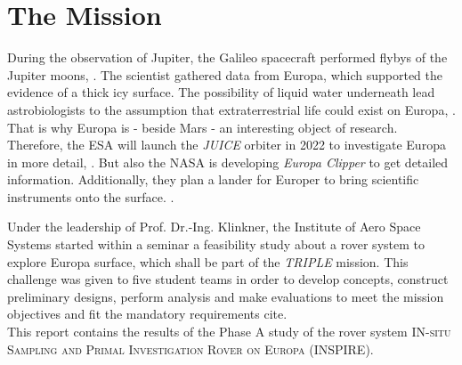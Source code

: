 %
%
%
\chapter{The Mission}
\label{chap:mission}

During the observation  of Jupiter, the Galileo spacecraft performed flybys of the Jupiter moons, \cite{Mission_01}.
The scientist gathered data from Europa, which supported the evidence of a thick icy surface.
The possibility of liquid water underneath lead astrobiologists to the assumption that extraterrestrial life could exist on Europa, \cite{Mission_02}.
That is why Europa is - beside Mars - an interesting object of research.\\

Therefore, the ESA will launch the \textit{JUICE} orbiter in 2022 to investigate Europa in more detail, \cite{Mission_03}. 
But also the NASA is developing  \textit{Europa Clipper} to get detailed information.
Additionally, they plan a lander for Europer to bring scientific instruments onto the surface. \cite{Mission_04} \cite{Mission_05}.

Under the leadership of  Prof. Dr.-Ing. Klinkner, the Institute of Aero Space Systems started within a seminar a feasibility study about a rover system to explore Europa surface, which shall  be part of the \textit{TRIPLE} mission.
This challenge was given to five student teams in order to develop concepts, construct preliminary designs, perform analysis and make evaluations to  meet the mission objectives and fit the mandatory requirements cite. \\


This report contains the results of the Phase A study of the rover system \textsc{IN-situ Sampling and Primal Investigation Rover on Europa}  (INSPIRE).
